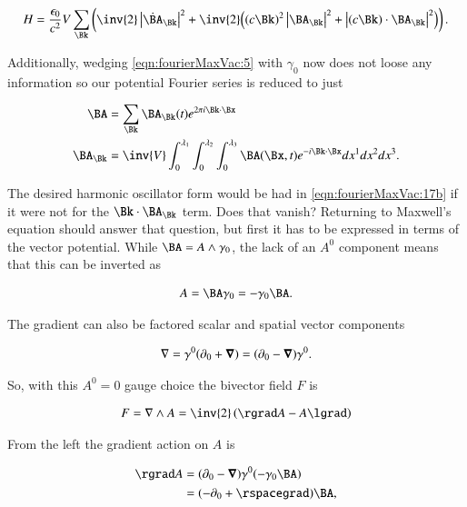 \begin{align}
\label{eqn:fourierMaxVac:17b}
H = 
\frac{\epsilon_0}{c^2} V \sum_\Bk
\left(
\inv{2} \Abs{\dot{\BA}_\Bk}^2
+
\inv{2} \Bigl(
(c \Bk)^2 \Abs{\BA_\Bk}^2 + \Abs{ ( c \Bk) \cdot \BA_\Bk}^2
\Bigr)
\right).
\end{align}

Additionally, wedging \autoref{eqn:fourierMaxVac:5} with $\gamma_0$ now does not loose any information so our potential Fourier series is reduced to just

\begin{subequations}
\label{eqn:fourierMaxVac:5b}
\begin{align}
\BA &= \sum_{\Bk} \BA_\Bk(t) e^{2 \pi i \Bk \cdot \Bx} \\
\BA_\Bk &= 
\inv{ V }
\int_0^{\lambda_1}
\int_0^{\lambda_2}
\int_0^{\lambda_3} \BA(\Bx, t) e^{-i \Bk \cdot \Bx} dx^1 dx^2 dx^3.
\end{align}
\end{subequations}

The desired harmonic oscillator form would be had in \autoref{eqn:fourierMaxVac:17b} if it were not for the $\Bk \cdot \BA_\Bk$ term.  Does that vanish?  Returning to Maxwell's equation should answer that question, but first it has to be expressed in terms of the vector potential.  While $\BA = A \wedge \gamma_0$, the lack of an $A^0$ component means that this can be inverted as

\begin{align}\label{eqn:fourierMaxVac:41}
A = \BA \gamma_0 = -\gamma_0 \BA.
\end{align}

The gradient can also be factored scalar and spatial vector components

\begin{align}\label{eqn:fourierMaxVac:42}
\nabla = \gamma^0 ( \partial_0 + \boldsymbol{\nabla} ) = ( \partial_0 - \boldsymbol{\nabla} ) \gamma^0.
\end{align}

So, with this $A^0 = 0$ gauge choice the bivector field $F$ is

\begin{align}\label{eqn:fourierMaxVac:43}
F = \grad \wedge A = \inv{2} \left( \rgrad A - A \lgrad \right) 
\end{align}

From the left the gradient action on $A$ is

\begin{align*}
\rgrad A 
&= ( \partial_0 - \spacegrad ) \gamma^0 (-\gamma_0 \BA) \\
&= ( -\partial_0 + \rspacegrad ) \BA,
\end{align*}

